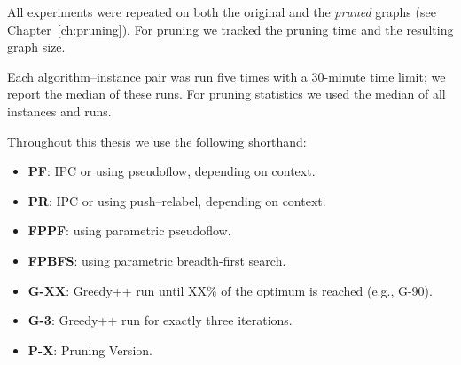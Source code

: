 All experiments were repeated on both the original and the \emph{pruned} graphs
(see Chapter~\ref{ch:pruning}).
For pruning we tracked the pruning time and the resulting graph size.

Each algorithm–instance pair was run five times with a 30-minute time limit;
we report the median of these runs.
For pruning statistics we used the median of all instances and runs.

Throughout this thesis we use the following shorthand:
\begin{itemize}
    \item \textbf{PF}: IPC or {\DSPwithR} using pseudoflow, depending on context.
    \item \textbf{PR}: IPC or {\DSPwithR} using push–relabel, depending on context.
    \item \textbf{FPPF}: {\DSPwithFBA} using parametric pseudoflow.
    \item \textbf{FPBFS}: {\DSPwithFBA} using parametric breadth-first search.
    \item \textbf{G-XX}: Greedy++ run until XX\% of the optimum is reached (e.g., G-90).
    \item \textbf{G-3}: Greedy++ run for exactly three iterations.
    \item \textbf{P-X}: Pruning Version.
\end{itemize}





%
%
